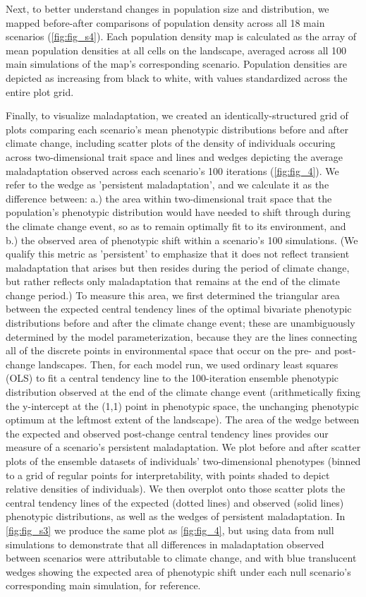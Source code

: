 \documentclass[9pt,twocolumn,twoside,lineno]{pnas-new}
\begin{document}
{Next, to better understand changes in population size and distribution,
we mapped before-after comparisons of population density across all 18
main scenarios (\ref{fig:fig_s4}).
Each population density map is calculated as
the array of mean population densities at all cells on the landscape,
averaged across all 100 main simulations of the map's corresponding scenario.
Population densities are depicted as increasing from black to white, with
values standardized across the entire plot grid.

Finally, to visualize maladaptation, we created an identically-structured
grid of plots comparing each scenario's
mean phenotypic distributions before and after climate change,
including scatter plots of the density of individuals occuring across
two-dimensional trait space and lines and wedges depicting the average maladaptation
observed across each scenario's 100 iterations (\ref{fig:fig_4}).
We refer to the wedge as 'persistent maladaptation',
and we calculate it as the difference between: a.) the area 
within two-dimensional trait space that the population’s phenotypic distribution 
would have needed to shift through during the climate change event, so as to remain 
optimally fit to its environment, and b.) the observed area of phenotypic shift within
a scenario's 100 simulations.
(We qualify this metric as 'persistent' to emphasize that it does
not reflect transient maladaptation that arises but then
resides during the period of climate change, but rather reflects
only maladaptation that remains at the end of the climate change period.)
To measure this area, we first determined the triangular area between 
the expected central tendency lines of the optimal bivariate phenotypic distributions
before and after the climate change event;
these are unambiguously determined by the model parameterization, because
they are the lines connecting all of the discrete 
points in environmental space that occur on the pre- and post-change landscapes.
Then, for each model run, we used ordinary least squares (OLS)
to fit a central tendency line to the 100-iteration ensemble phenotypic distribution
observed at the end of the climate change event
(arithmetically fixing the y-intercept at the (1,1) point in phenotypic 
space, the unchanging phenotypic optimum at the leftmost extent of the landscape).
The area of the wedge between the expected and observed post-change central tendency
lines provides our measure of a scenario's persistent maladaptation.
We plot before and after scatter plots of the ensemble datasets
of individuals' two-dimensional phenotypes
(binned to a grid of regular points for interpretability, with points
shaded to depict relative densities of individuals).
We then overplot onto those scatter plots the central tendency lines of
the expected (dotted lines) and observed (solid lines) phenotypic distributions,
as well as the wedges of persistent maladaptation.
In \ref{fig:fig_s3} we produce the same plot as \ref{fig:fig_4},
but using data from null simulations to demonstrate that all differences
in maladaptation observed between scenarios were attributable to climate change,
and with blue translucent wedges showing the expected area of phenotypic shift
under each null scenario's corresponding main simulation, for reference.

}
\end{document}
